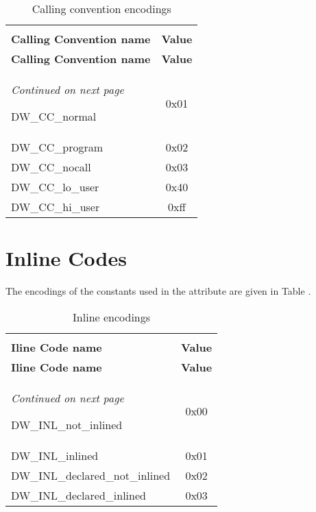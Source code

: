 \begin{centering}
\setlength{\extrarowheight}{0.1cm}
\begin{longtable}{l|c}
  \caption{Calling convention encodings} \label{tab:callingconventionencodings}\\
  \hline \\ \bfseries Calling Convention name&\bfseries Value \\ \hline
\endfirsthead
  \bfseries Calling Convention name&\bfseries Value\\ \hline
\endhead
  \hline \emph{Continued on next page}
\endfoot
  \hline
\endlastfoot

DW\-\_CC\-\_normal&0x01     \\
DW\-\_CC\-\_program&0x02     \\
DW\-\_CC\-\_nocall&0x03     \\
DW\-\_CC\-\_lo\-\_user&0x40     \\
DW\-\_CC\-\_hi\-\_user&0xff     \\

\end{longtable}
\end{centering}

\section{Inline Codes}
\label{datarep:inlinecodes}

The encodings of the constants used in the 
 attribute are given in 
Table .

\begin{centering}
\setlength{\extrarowheight}{0.1cm}
\begin{longtable}{l|c}
  \caption{Inline encodings} \label{tab:inlineencodings}\\
  \hline \\ \bfseries Iline Code name&\bfseries Value \\ \hline
\endfirsthead
  \bfseries Iline Code name&\bfseries Value\\ \hline
\endhead
  \hline \emph{Continued on next page}
\endfoot
  \hline
\endlastfoot

DW\-\_INL\-\_not\-\_inlined&0x00      \\
DW\-\_INL\-\_inlined&0x01      \\
DW\-\_INL\-\_declared\-\_not\-\_inlined&0x02      \\
DW\-\_INL\-\_declared\-\_inlined&0x03      \\

\end{longtable}
\end{centering}

